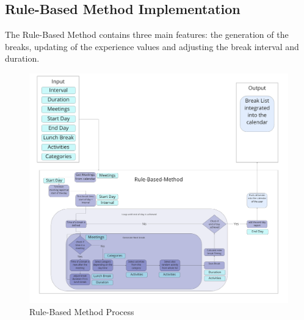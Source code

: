 \documentclass{hasel_thesis}
\begin{document}
\subsection{Rule-Based Method Implementation} \label{rule-based-method-implementation}

The Rule-Based Method contains three main features: the generation of the breaks, updating of the experience values and adjusting the break interval and duration.

\begin{figure}[htp]
    \centering
    \includegraphics[width=15cm]{hasel_thesis/images/rule-based_method.png}
    \caption{Rule-Based Method Process}
    \label{fig:rule-based_method}
\end{figure}
\end{document}
